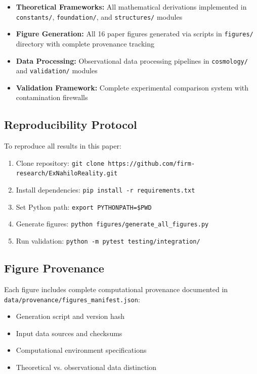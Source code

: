 \documentclass[12pt]{article}
\begin{document}
\begin{itemize}
    \item \textbf{Theoretical Frameworks:} All mathematical derivations implemented in \texttt{constants/}, \texttt{foundation/}, and \texttt{structures/} modules
    \item \textbf{Figure Generation:} All 16 paper figures generated via scripts in \texttt{figures/} directory with complete provenance tracking
    \item \textbf{Data Processing:} Observational data processing pipelines in \texttt{cosmology/} and \texttt{validation/} modules
    \item \textbf{Validation Framework:} Complete experimental comparison system with contamination firewalls
\end{itemize}

\subsection{Reproducibility Protocol}

To reproduce all results in this paper:

\begin{enumerate}
    \item Clone repository: \texttt{git clone https://github.com/firm-research/ExNahiloReality.git}
    \item Install dependencies: \texttt{pip install -r requirements.txt}
    \item Set Python path: \texttt{export PYTHONPATH=\$PWD}
    \item Generate figures: \texttt{python figures/generate\_all\_figures.py}
    \item Run validation: \texttt{python -m pytest testing/integration/}
\end{enumerate}

\subsection{Figure Provenance}

Each figure includes complete computational provenance documented in \texttt{data/provenance/figures\_manifest.json}:
\begin{itemize}
    \item Generation script and version hash
    \item Input data sources and checksums  
    \item Computational environment specifications
    \item Theoretical vs. observational data distinction
\end{itemize}
\end{document}
